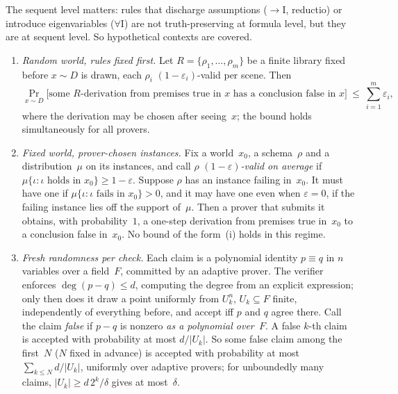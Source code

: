 The sequent level matters: rules that discharge assumptions ($\to$I, reductio) or introduce eigenvariables ($\forall$I) are not truth-preserving at formula level, but they are at sequent level. So hypothetical contexts are covered.

\begin{lemma}\label{lem:search:commitment}
\leavevmode
\begin{enumerate}[label=(\roman*)]
\item \emph{Random world, rules fixed first.} Let $R=\{\rho_1,\dots,\rho_m\}$ be a finite library fixed before $x\sim D$ is drawn, each $\rho_i$ $(1-\varepsilon_i)$-valid per scene. Then
\[
\Pr_{x\sim D}\big[\text{some $R$-derivation from premises true in $x$ has a conclusion false in $x$}\big]\ \le\ \textstyle\sum_{i=1}^m\varepsilon_i ,
\]
where the derivation may be chosen after seeing~$x$; the bound holds simultaneously for all provers.
\item \emph{Fixed world, prover-chosen instances.} Fix a world~$x_0$, a schema~$\rho$ and a distribution~$\mu$ on its instances, and call $\rho$ \emph{$(1-\varepsilon)$-valid on average} if $\mu\{\iota:\iota\text{ holds in }x_0\}\ge1-\varepsilon$. Suppose $\rho$ has an instance failing in~$x_0$. It must have one if $\mu\{\iota:\iota\text{ fails in }x_0\}>0$, and it may have one even when $\varepsilon=0$, if the failing instance lies off the support of~$\mu$. Then a prover that submits it obtains, with probability~$1$, a one-step derivation from premises true in~$x_0$ to a conclusion false in~$x_0$. No bound of the form~(i) holds in this regime.
\item \emph{Fresh randomness per check.} Each claim is a polynomial identity $p\equiv q$ in $n$ variables over a field~$F$, committed by an adaptive prover. The verifier enforces $\deg(p-q)\le d$, computing the degree from an explicit expression; only then does it draw a point uniformly from $U_k^n$, $U_k\subseteq F$ finite, independently of everything before, and accept iff $p$ and $q$ agree there. Call the claim \emph{false} if $p-q$ is nonzero \emph{as a polynomial over~$F$}. A false $k$-th claim is accepted with probability at most $d/|U_k|$. So some false claim among the first~$N$ ($N$ fixed in advance) is accepted with probability at most $\sum_{k\le N}d/|U_k|$, uniformly over adaptive provers; for unboundedly many claims, $|U_k|\ge d\,2^k/\delta$ gives at most~$\delta$.
\end{enumerate}
\end{lemma}

